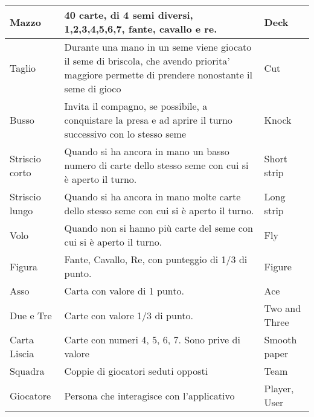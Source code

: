 \begin{table}[!ht]
\begin{adjustbox}{max width=1.1\textwidth,center}
\begin{tabular}{|l|l|l|}
        Mazzo & 40 carte, di 4 semi diversi, 1,2,3,4,5,6,7, fante, cavallo e re. & Deck \\ \hline
        Taglio & Durante una mano in un seme viene giocato il seme di briscola, che avendo priorita’ maggiore permette di prendere nonostante il seme di gioco & Cut \\ \hline
        Busso & Invita il compagno, se possibile, a conquistare la presa e ad aprire il turno successivo con lo stesso seme & Knock \\ \hline
        Striscio corto & Quando si ha ancora in mano un basso numero di carte dello stesso seme con cui si è aperto il turno. & Short strip \\ \hline
        Striscio lungo & Quando si ha ancora in mano molte carte dello stesso seme con cui si è aperto il turno. & Long strip \\ \hline
        Volo & Quando non si hanno più carte del seme con cui si è aperto il turno. & Fly \\ \hline
        Figura & Fante, Cavallo, Re, con punteggio di 1/3 di punto. & Figure \\ \hline
        Asso & Carta con valore di 1 punto. & Ace \\ \hline
        Due e Tre & Carte con valore 1/3 di punto. & Two and Three \\ \hline
        Carta Liscia & Carte con numeri 4, 5, 6, 7. Sono prive di valore & Smooth paper \\ \hline
        Squadra & Coppie di giocatori seduti opposti & Team \\ \hline
        Giocatore & Persona che interagisce con l’applicativo & Player, User \\ \hline
    \end{tabular}
    \end{adjustbox}
\end{table}
